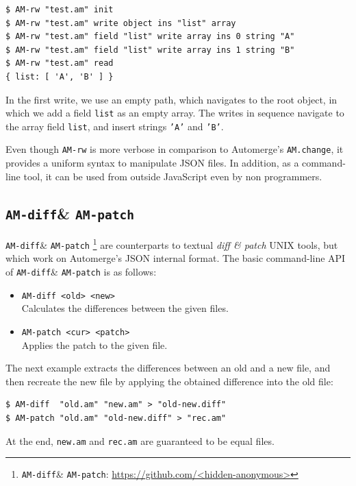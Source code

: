 \documentclass[12pt]{article}
\newcommand{\code}[1]  {\texttt{\footnotesize{#1}}}
\newcommand{\amrw}       {\code{AM-rw}\xspace}
\newcommand{\amdiff}     {\code{AM-diff}\xspace}
\newcommand{\ampatch}    {\code{AM-patch}\xspace}
\begin{document}
{\footnotesize
\begin{verbatim}
$ AM-rw "test.am" init
$ AM-rw "test.am" write object ins "list" array
$ AM-rw "test.am" field "list" write array ins 0 string "A"
$ AM-rw "test.am" field "list" write array ins 1 string "B"
$ AM-rw "test.am" read
{ list: [ 'A', 'B' ] }
\end{verbatim}
}

In the first write, we use an empty path, which navigates to the root object,
in which we add a field \code{list} as an empty array.
The writes in sequence navigate to the array field \code{list}, and insert
strings \code{'A'} and \code{'B'}.

Even though \amrw is more verbose in comparison to Automerge's
\code{AM.change}, it provides a uniform syntax to manipulate JSON files.
In addition, as a command-line tool, it can be used from outside JavaScript
even by non programmers.

\subsection{\amdiff \& \ampatch}

\amdiff \& \ampatch%
    \footnote{\amdiff \& \ampatch: \url{https://github.com/<hidden-anonymous>}}
are counterparts to textual \emph{diff \& patch} UNIX tools, but which work on
Automerge's JSON internal format.
%
The basic command-line API of \amdiff \& \ampatch is as follows:

\begin{itemize}
\item \code{AM-diff <old> <new>} \\
    Calculates the differences between the given files.
\item \code{AM-patch <cur> <patch>} \\
    Applies the patch to the given file.
\end{itemize}

The next example extracts the differences between an old and a new file, and
then recreate the new file by applying the obtained difference into the old
file:

{\footnotesize
\begin{verbatim}
$ AM-diff  "old.am" "new.am" > "old-new.diff"
$ AM-patch "old.am" "old-new.diff" > "rec.am"
\end{verbatim}
}

At the end, \code{new.am} and \code{rec.am} are guaranteed to be equal files.
\end{document}
